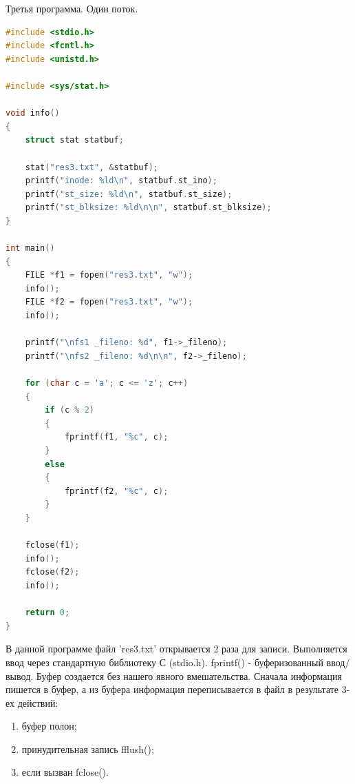 \documentclass[a4paper,oneside,12pt]{extreport}
\begin{document}
\newpage
\begin{task}
    Третья программа. Один поток.

    \begin{lstlisting}[language=C]
#include <stdio.h>
#include <fcntl.h>
#include <unistd.h>

#include <sys/stat.h>

void info()
{
	struct stat statbuf;
	
	stat("res3.txt", &statbuf);
	printf("inode: %ld\n", statbuf.st_ino);
	printf("st_size: %ld\n", statbuf.st_size);
	printf("st_blksize: %ld\n\n", statbuf.st_blksize);
}

int main()
{
	FILE *f1 = fopen("res3.txt", "w");
	info();
	FILE *f2 = fopen("res3.txt", "w");
	info();
	
	printf("\nfs1 _fileno: %d", f1->_fileno);
	printf("\nfs2 _fileno: %d\n\n", f2->_fileno);
	
	for (char c = 'a'; c <= 'z'; c++)
	{
		if (c % 2)
		{
			fprintf(f1, "%c", c);
		}
		else
		{
			fprintf(f2, "%c", c);
		}
	}
	
	fclose(f1);
	info();
	fclose(f2);
	info();
	
	return 0;
}
    \end{lstlisting}

    В данной программе файл 'res3.txt' открывается 2 раза для записи.
    Выполняется ввод через стандартную библиотеку С (stdio.h). 
    fprintf() - буферизованный ввод/вывод. 
    Буфер создается без нашего явного вмешательства.
    Сначала информация пишется в буфер, а из буфера информация 
    переписывается в файл в результате 3-ех действий:
    \begin{enumerate}
        \item буфер полон;
        \item принудительная запись fflush();
        \item если вызван fclose().
    \end{enumerate}   

    \begin{figure}[ht!]
    \end{figure}


\end{task}
\end{document}
